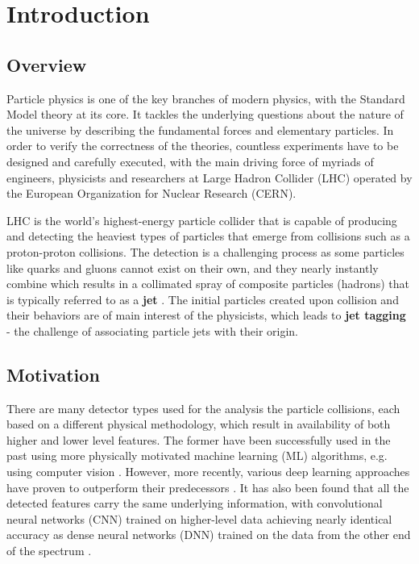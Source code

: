 \chapter{Introduction}

\section{Overview}
Particle physics is one of the key branches of modern physics, with the Standard Model theory at its core. It tackles the underlying questions about the nature of the universe by describing the fundamental forces and elementary particles. In order to verify the correctness of the theories, countless experiments have to be designed and carefully executed, with the main driving force of myriads of engineers, physicists and researchers at Large Hadron Collider (LHC) operated by the European Organization for Nuclear Research (CERN).

LHC is the world's highest-energy particle collider that is capable of producing and detecting the heaviest types of particles that emerge from collisions such as a proton-proton collisions. The detection is a challenging process as some particles like quarks and gluons cannot exist on their own, and they nearly instantly combine which results in a collimated spray of composite particles (hadrons) that is typically referred to as a \textbf{jet} \cite{RefWorks:RefID:4-cernjets}. The initial particles created upon collision and their behaviors are of main interest of the physicists, which leads to \textbf{jet tagging} - the challenge of associating particle jets with their origin.


\section{Motivation}
There are many detector types used for the analysis the particle collisions, each based on a different physical methodology, which result in availability of both higher and lower level features. The former have been successfully used in the past using more physically motivated machine learning (ML) algorithms, e.g. using computer vision \cite{RefWorks:RefID:5-cogan2015jet-images:}. However, more recently, various deep learning approaches have proven to outperform their predecessors \cite{RefWorks:RefID:6-de2016jet-images}. It has also been found that all the detected features carry the same underlying information, with convolutional neural networks (CNN) trained on higher-level data achieving nearly identical accuracy as dense neural networks (DNN) trained on the data from the other end of the spectrum \cite{RefWorks:RefID:7-moore2019reports}.

